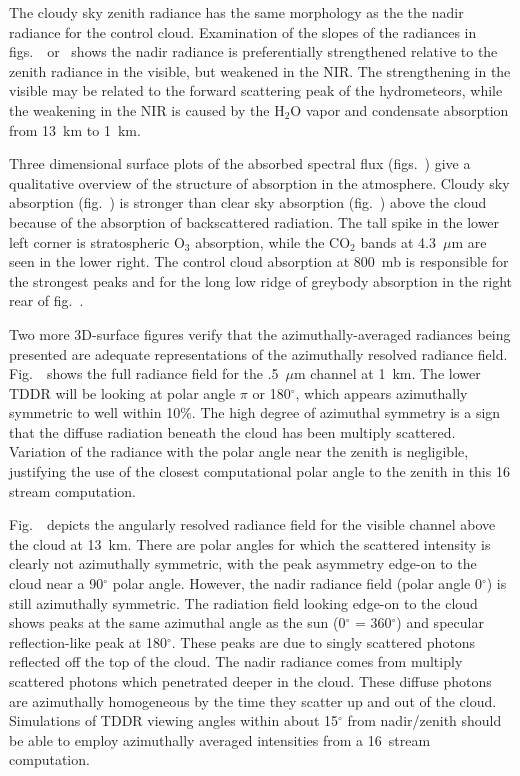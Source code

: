 The cloudy sky zenith radiance has the same morphology as the
the nadir radiance for the control cloud.
Examination of the slopes of the radiances in
figs.~\ or \ 
shows the nadir radiance is preferentially strengthened relative to
the zenith radiance in the visible, but weakened in the NIR.
The strengthening in the visible may be related to the forward
scattering peak of the hydrometeors, 
while the weakening in the NIR is caused by the H$_2$O vapor and
condensate absorption from 13~km to 1~km.

Three dimensional surface plots of the
absorbed spectral flux (figs.~\/) give a  
qualitative overview of the structure of absorption in the
atmosphere.
Cloudy sky absorption (fig.~\/) 
 is stronger than 
clear sky absorption (fig.~\/) 
above the cloud because of the absorption of backscattered radiation.
The tall spike in the lower left corner is stratospheric O$_3$
absorption, while the CO$_2$ bands at 4.3~$\mu$m are seen in the lower
right.
The control cloud absorption at 800~mb is responsible for the
strongest peaks and for the long low ridge of greybody absorption in
the right rear of fig.~\figref{spec_abs}{\it b}.

Two more 3D-surface figures
verify that the azimuthally-averaged radiances being presented are 
adequate representations of the azimuthally resolved 
radiance field. 
Fig.~\ 
shows the full radiance field for the .5~$\mu$m channel at 1~km.
The lower TDDR will be looking at polar angle $\pi$ or 180$^\circ$,
which appears azimuthally symmetric to well within 10\%.
The high degree of azimuthal symmetry is a sign
that  the diffuse radiation beneath the cloud has been multiply
scattered. 
Variation of the radiance with the polar angle near the zenith is
negligible, justifying the use of the closest computational polar
angle to the zenith in this 16 stream computation.

Fig.~\ 
depicts the angularly resolved radiance field for the
visible channel above the cloud at 13~km. 
There are polar angles for which the
scattered intensity is clearly not azimuthally symmetric, with the
peak asymmetry edge-on to the cloud near a 90$^\circ$ polar angle.
However, the nadir radiance field (polar angle 0$^\circ$) is still
azimuthally symmetric.
The radiation field looking edge-on to the cloud shows peaks at the
same azimuthal angle as the sun (0$^\circ$ = 360$^\circ$) and specular
reflection-like peak at 180$^\circ$. 
These peaks are due to
singly scattered photons reflected off the top of the cloud. 
The nadir radiance
comes from multiply scattered photons which penetrated
deeper in the cloud.
These diffuse photons are azimuthally homogeneous by the time they
scatter up and out of the cloud.
Simulations of TDDR viewing angles within about
15$^\circ$ from nadir/zenith should be able to employ 
azimuthally averaged intensities from a 16~stream computation.
\medskip
\noindent{\sl Sensitivity to increasing {\it LWP\/}}\nobreak

